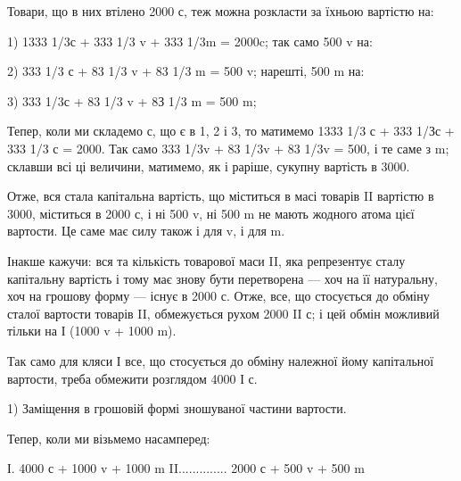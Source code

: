 Товари, що в них втілено 2000 с, теж можна розкласти за їхньою
вартістю на:

1) 1333 1/3с + 333 1/3 v + 333 1/3m = 2000c; так само 500 v на:

2) 333 1/3 с + 83 1/3 v + 83 1/3 m = 500 v; нарешті, 500 m на:

3) 333 1/3с + 83 1/3 v + 8З 1/3 m = 500 m;

Тепер, коли ми складемо с, що є в 1, 2 і 3, то матимемо 1333 1/3 с
+ 333 1/Зс + 333 1/3 с = 2000. Так само 333 1/3v + 83 1/3v + 83 1/3v
= 500, і те саме з m; склавши всі ці величини, матимемо, як і раріше,
сукупну вартість в 3000.

Отже, вся стала капітальна вартість, що міститься в масі товарів II
вартістю в 3000, міститься в 2000 с, і ні 500 v, ні 500 m не мають
жодного атома цієї вартости. Це саме має силу також і для v, і для m.

Інакше кажучи: вся та кількість товарової маси II, яка репрезентує
сталу капітальну вартість і тому має знову бути перетворена — хоч
на її натуральну, хоч на грошову форму — існує в 2000 с. Отже, все, що
стосується до обміну сталої вартости товарів II, обмежується рухом 2000
II с; і цей обмін можливий тільки на І (1000 v + 1000 m).

Так само для кляси І все, що стосується до обміну належної йому
капітальної вартости, треба обмежити розглядом 4000 І с.

1) Заміщення в грошовій формі зношуваної частини вартости.

Тепер, коли ми візьмемо насамперед:

І. 4000 с + 1000 v + 1000 m
II..............  2000 с + 500 v + 500 m

